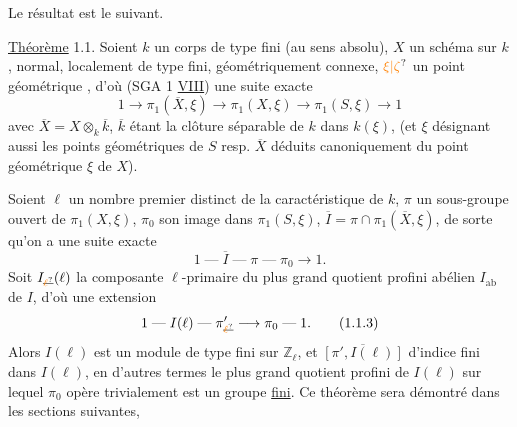  Le résultat   est le suivant.

\uline{Théorème} 1.1. Soient $k$ un corps   de type fini (au sens absolu), $X$ un schéma sur  $k$, normal, localement de type fini,  géométriquement connexe, $\unsure{\xi|\zeta}$ un point géométrique , d'où (SGA 1 \uline{VIII}) une suite exacte
\[
1\longrightarrow\pi_1(\overline X,\xi)\longrightarrow\pi_1(X,\xi)\longrightarrow\pi_1(S,\xi)\longrightarrow1
\tag*{(1.1.1)}
\]
avec  $\overline X=X\otimes_k\overline k$, $\overline k$ étant la clôture séparable de $k$ dans $k(\xi)$, (et $\xi$ désignant aussi les points géométriques de $S$ resp. $\overline X$ déduits canoniquement du \deleted{\unsure{$\xi$}} point géométrique $\xi$ de $X$). 

 Soient $\ell$ un nombre premier distinct de la caractéristique de $k$,  $\pi$ un sous-groupe ouvert de $\pi_1(X,\xi)$, $\pi_0$ son image dans $\pi_1(S,\xi)$, $\overline I=\pi\cap\pi_1(\overline X,\xi)$, de sorte qu'on a une suite exacte
\[
1\mathrel{\text{---}}\overline I\mathrel{\text{---}}\pi\mathrel{\text{---}}\pi_0\longrightarrow1.
\tag*{(1.1.2)}
\]
Soit $I_{\deleted{\unsure{\ell}}}(\ell)$ la composante $\ell$-primaire du plus grand quotient profini abélien $I_{\mathrm{ab}}$ de $I$,  d'où  une extension
\[
1\mathrel{\text{---}}I(\ell)\mathrel{\text{---}}\pi'_{\deleted{\unsure{\ell}}}\longrightarrow\pi_0\mathrel{\text{---}}1.
\tag*{(1.1.3)}
\]
Alors  $I(\ell)$ est un module de type fini sur $\mathbb{Z}_\ell$, et $\overline{[\pi',I(\ell)]}$  d'indice fini dans $I(\ell)$, en d'autres termes  le plus grand quotient profini de $I(\ell)$ sur lequel $\pi_0$ opère trivialement est un groupe \uline{fini}.
Ce théorème sera démontré dans les sections suivantes, 


